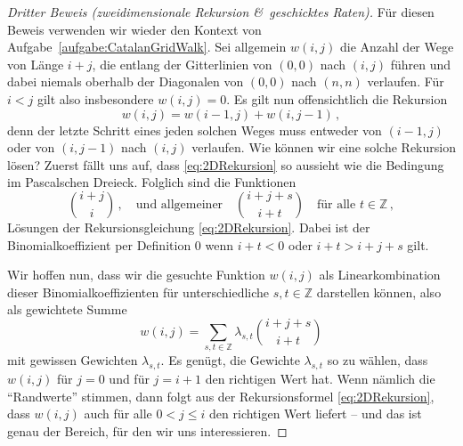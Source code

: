 \begin{proof}[Dritter Beweis \textmd{(\emph{zweidimensionale Rekursion \&\ geschicktes Raten})}]
	Für diesen Beweis verwenden wir wieder den Kontext von Aufgabe~\ref{aufgabe:CatalanGridWalk}. Sei allgemein $w(i,j)$ die Anzahl der Wege von Länge $i+j$, die entlang der Gitterlinien von $(0,0)$ nach $(i,j)$ führen und dabei niemals oberhalb der Diagonalen von $(0,0)$ nach $(n,n)$ verlaufen. Für $i<j$ gilt also insbesondere $w(i,j)=0$. Es gilt nun offensichtlich die Rekursion
	\begin{equation*}\label{eq:2DRekursion}
		w(i,j)=w(i-1,j)+w(i,j-1)\,,\tag{$*$}
	\end{equation*}
	denn der letzte Schritt eines jeden solchen Weges muss entweder von $(i-1,j)$ oder von $(i,j-1)$ nach $(i,j)$ verlaufen. Wie können wir eine solche Rekursion lösen? Zuerst fällt uns auf, dass \eqref{eq:2DRekursion} so aussieht wie die Bedingung im Pascalschen Dreieck. Folglich sind die Funktionen
	\begin{equation*}
		\binom{i+j}{i}\,,\quad\text{und allgemeiner}\quad \binom{i+j+s}{i+t}\quad\text{für alle }t\in\mathbb Z\,,
	\end{equation*}
	Lösungen der Rekursionsgleichung \eqref{eq:2DRekursion}. Dabei ist der Binomialkoeffizient per Definition $0$ wenn $i+t<0$ oder $i+t>i+j+s$ gilt. 
	
	Wir hoffen nun, dass wir die gesuchte Funktion $w(i,j)$ als Linearkombination dieser Binomialkoeffizienten für unterschiedliche $s,t\in\mathbb Z$ darstellen können, also als gewichtete Summe
	\begin{equation*}
		w(i,j)=\sum_{s,t\in\mathbb Z}\lambda_{s,t}\binom{i+j+s}{i+t}
	\end{equation*}
	mit gewissen Gewichten $\lambda_{s,t}$. Es genügt, die Gewichte $\lambda_{s,t}$ so zu wählen, dass $w(i,j)$ für $j=0$ und für $j=i+1$ den richtigen Wert hat. Wenn nämlich die \enquote{Randwerte} stimmen, dann folgt aus der Rekursionsformel \eqref{eq:2DRekursion}, dass $w(i,j)$ auch für alle $0<j\leqslant i$ den richtigen Wert liefert -- und das ist genau der Bereich, für den wir uns interessieren.
	

\end{proof}
